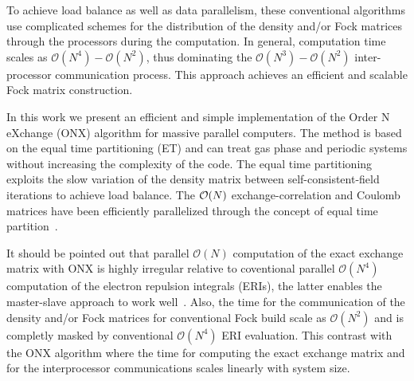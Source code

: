 \documentclass[prl,twocolumn,showpacs,twocolumngrid,superbib]{revtex4}
\begin{document}
 To achieve load balance as well as data parallelism, 
 these conventional algorithms use complicated schemes for the 
 distribution of the density and/or Fock 
 matrices through the processors during the computation.
 In general, computation time scales as $\mathcal{O}(N^4)-\mathcal{O}(N^2)$, thus dominating
 the $\mathcal{O}(N^3)-\mathcal{O}(N^2)$ inter-processor communication process.
 This approach achieves an efficient and scalable Fock matrix construction.





 In this work we present an efficient and simple implementation 
 of the Order N eXchange (ONX) algorithm for massive parallel computers. The method
 is based on the equal time partitioning (ET) and can treat gas phase and periodic systems 
 without increasing the complexity of the code. The equal time partitioning exploits 
 the slow variation of the density matrix between self-consistent-field iterations
 to achieve load balance. The ${\cal O}(N)$ exchange-correlation and Coulomb matrices
 have been efficiently parallelized through the concept of equal time
 partition~\cite{CGan03,CGan04B}.

 It should be pointed out that parallel $\mathcal{O}(N)$ computation
 of the exact exchange matrix with ONX is highly irregular relative 
 to coventional parallel $\mathcal{O}(N^4)$ computation of the electron repulsion integrals (ERIs), 
 the latter enables the master-slave approach to work well~\cite{RHarrison96}.
 Also, the time for the communication of the density and/or Fock matrices for conventional Fock build
 scale as $\mathcal{O}(N^2)$ and is completly masked by conventional $\mathcal{O}(N^4)$ ERI evaluation.
 This contrast with the ONX algorithm where the time for computing the exact 
 exchange matrix and for the interprocessor communications scales linearly with system size.
\end{document}
